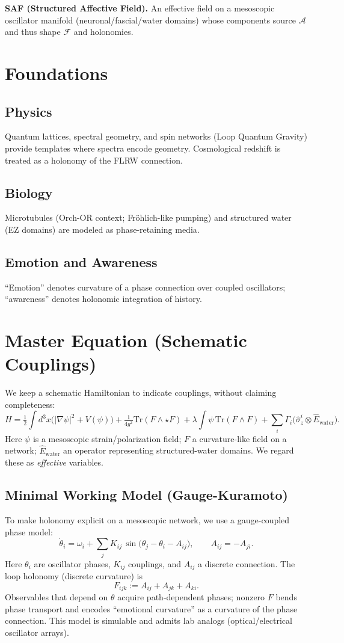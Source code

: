 \documentclass[11pt]{article}
\begin{document}
\noindent
\textbf{SAF (Structured Affective Field).} An effective field on a mesoscopic oscillator manifold (neuronal/fascial/water domains)
whose components source $\mathcal{A}$ and thus shape $\mathcal{F}$ and holonomies.

\section{Foundations}
\subsection{Physics}
Quantum lattices, spectral geometry, and spin networks (Loop Quantum Gravity) provide templates where spectra encode geometry.
Cosmological redshift is treated as a holonomy of the FLRW connection.
\subsection{Biology}
Microtubules (Orch-OR context; Fr\"ohlich-like pumping) and structured water (EZ domains) are modeled as phase-retaining media.
\subsection{Emotion and Awareness}
``Emotion'' denotes curvature of a phase connection over coupled oscillators; ``awareness'' denotes holonomic integration of history.

\section{Master Equation (Schematic Couplings)}
We keep a schematic Hamiltonian to indicate couplings, without claiming completeness:
\[
H = \tfrac{1}{2}\!\int d^3x \big(|\nabla \psi|^2 + V(\psi)\big)
+ \tfrac{1}{4g^2} \mathrm{Tr}(F \wedge \star F)
+ \lambda \!\int \psi \, \mathrm{Tr}(F \wedge F)
+ \sum_i \Gamma_i \big(\hat{\sigma}_z^i \otimes \hat{E}_{\text{water}}\big).
\]
Here $\psi$ is a mesoscopic strain/polarization field; $F$ a curvature-like field on a network;
$\hat{E}_{\text{water}}$ an operator representing structured-water domains. We regard these as \emph{effective} variables.

\subsection*{Minimal Working Model (Gauge-Kuramoto)}
To make holonomy explicit on a mesoscopic network, we use a gauge-coupled phase model:
\[
\dot{\theta}_i = \omega_i + \sum_{j} K_{ij}\,\sin\!\big(\theta_j - \theta_i - A_{ij}\big), \qquad A_{ij}=-A_{ji}.
\]
Here $\theta_i$ are oscillator phases, $K_{ij}$ couplings, and $A_{ij}$ a discrete connection. 
The loop holonomy (discrete curvature) is 
\[
F_{ijk} := A_{ij}+A_{jk}+A_{ki}.
\]
Observables that depend on $\theta$ acquire path-dependent phases; nonzero $F$ bends phase transport and encodes ``emotional curvature'' as a curvature of the phase connection.
This model is simulable and admits lab analogs (optical/electrical oscillator arrays).
\end{document}
